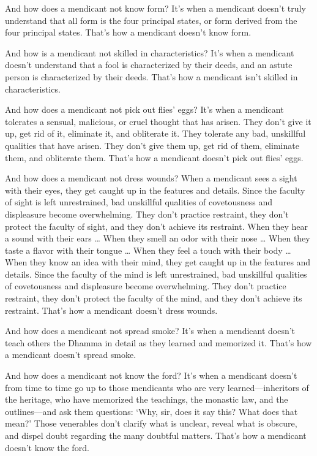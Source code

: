 \documentclass[12pt,openany]{book}%
\begin{document}
And how does a mendicant not know form? It’s when a mendicant doesn’t truly understand that all form is the four principal states, or form derived from the four principal states. That’s how a mendicant doesn’t know form. 

And how is a mendicant not skilled in characteristics? It’s when a mendicant doesn’t understand that a fool is characterized by their deeds, and an astute person is characterized by their deeds. That’s how a mendicant isn’t skilled in characteristics. 

And how does a mendicant not pick out flies’ eggs? It’s when a mendicant tolerates a sensual, malicious, or cruel thought that has arisen. They don’t give it up, get rid of it, eliminate it, and obliterate it. They tolerate any bad, unskillful qualities that have arisen. They don’t give them up, get rid of them, eliminate them, and obliterate them. That’s how a mendicant doesn’t pick out flies’ eggs. 

And how does a mendicant not dress wounds? When a mendicant sees a sight with their eyes, they get caught up in the features and details. Since the faculty of sight is left unrestrained, bad unskillful qualities of covetousness and displeasure become overwhelming. They don’t practice restraint, they don’t protect the faculty of sight, and they don’t achieve its restraint. When they hear a sound with their ears … When they smell an odor with their nose … When they taste a flavor with their tongue … When they feel a touch with their body … When they know an idea with their mind, they get caught up in the features and details. Since the faculty of the mind is left unrestrained, bad unskillful qualities of covetousness and displeasure become overwhelming. They don’t practice restraint, they don’t protect the faculty of the mind, and they don’t achieve its restraint. That’s how a mendicant doesn’t dress wounds. 

And how does a mendicant not spread smoke? It’s when a mendicant doesn’t teach others the Dhamma in detail as they learned and memorized it. That’s how a mendicant doesn’t spread smoke. 

And how does a mendicant not know the ford? It’s when a mendicant doesn’t from time to time go up to those mendicants who are very learned—inheritors of the heritage, who have memorized the teachings, the monastic law, and the outlines—and ask them questions: ‘Why, sir, does it say this? What does that mean?’ Those venerables don’t clarify what is unclear, reveal what is obscure, and dispel doubt regarding the many doubtful matters. That’s how a mendicant doesn’t know the ford. 
\end{document}
